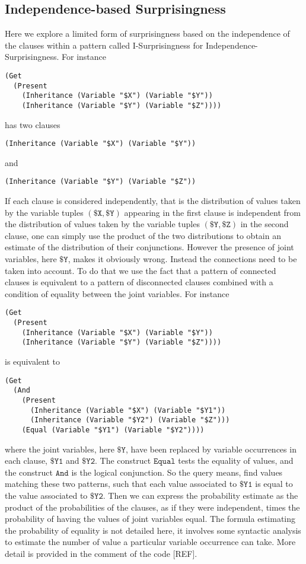 \documentclass[runningheads]{llncs}
\begin{document}
\subsection{Independence-based Surprisingness}
Here we explore a limited form of surprisingness based on the
independence of the clauses within a pattern called I-Surprisingness
for Independence-Surprisingness. For instance
\begin{verbatim}
(Get
  (Present
    (Inheritance (Variable "$X") (Variable "$Y"))
    (Inheritance (Variable "$Y") (Variable "$Z"))))
\end{verbatim}
has two clauses
\begin{verbatim}
(Inheritance (Variable "$X") (Variable "$Y"))
\end{verbatim}
and
\begin{verbatim}
(Inheritance (Variable "$Y") (Variable "$Z"))
\end{verbatim}
If each clause is considered independently, that is the distribution
of values taken by the variable tuples $(\texttt{\$X}, \texttt{\$Y})$
appearing in the first clause is independent from the distribution of
values taken by the variable tuples $(\texttt{\$Y}, \texttt{\$Z})$ in
the second clause, one can simply use the product of the two
distributions to obtain an estimate of the distribution of their
conjunctions. However the presence of joint variables, here
$\texttt{\$Y}$, makes it obviously wrong. Instead the connections need
to be taken into account. To do that we use the fact that a pattern of
connected clauses is equivalent to a pattern of disconnected clauses
combined with a condition of equality between the joint variables. For
instance
\begin{verbatim}
(Get
  (Present
    (Inheritance (Variable "$X") (Variable "$Y"))
    (Inheritance (Variable "$Y") (Variable "$Z"))))
\end{verbatim}
is equivalent to
\begin{verbatim}
(Get
  (And
    (Present
      (Inheritance (Variable "$X") (Variable "$Y1"))
      (Inheritance (Variable "$Y2") (Variable "$Z")))
    (Equal (Variable "$Y1") (Variable "$Y2"))))
\end{verbatim}
where the joint variables, here $\texttt{\$Y}$, have been replaced by
variable occurrences in each clause, $\texttt{\$Y1}$ and
$\texttt{\$Y2}$. The construct $\texttt{Equal}$ tests the equality of
values, and the construct $\texttt{And}$ is the logical
conjunction. So the query means, find values matching these two
patterns, such that each value associated to $\texttt{\$Y1}$ is equal
to the value associated to $\texttt{\$Y2}$. Then we can express the
probability estimate as the product of the probabilities of the
clauses, as if they were independent, times the probability of having
the values of joint variables equal. The formula estimating the
probability of equality is not detailed here, it involves some
syntactic analysis to estimate the number of value a particular
variable occurrence can take. More detail is provided in the comment
of the code [REF].
\end{document}
